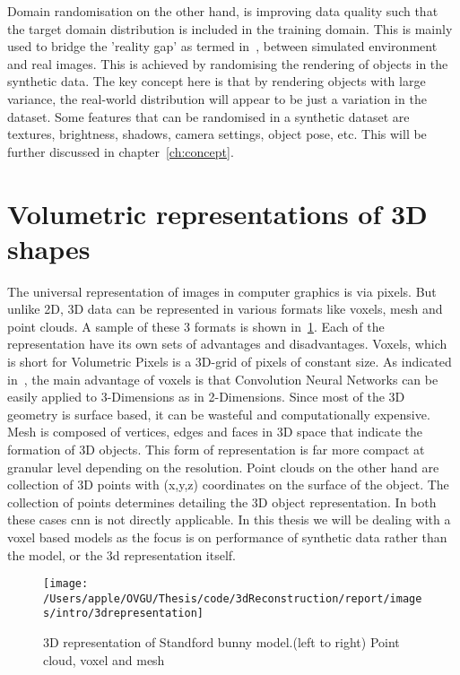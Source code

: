 Domain randomisation on the other hand, is improving data quality such that the target domain distribution is included in the training domain.
This is mainly used to bridge the 'reality gap' as termed in~\cite{tobin2017domain}, between simulated environment and real images.
This is achieved by randomising the rendering of objects in the synthetic data.
The key concept here is that by rendering objects with large variance, the real-world distribution will appear to be just a variation in the dataset.
Some features that can be randomised in a synthetic dataset are textures, brightness, shadows, camera settings, object pose, etc.
This will be further discussed in chapter~\ref{ch:concept}.


\section{Volumetric representations of 3D shapes} \label{sec:Volumetric representation}
The universal representation of images in computer graphics is via pixels.
But unlike 2D, 3D data can be represented in various formats like voxels, mesh and point clouds.
A sample of these 3 formats is shown in~\ref{fig:3d representation}.
Each of the representation have its own sets of advantages and disadvantages.
Voxels, which is short for Volumetric Pixels is a 3D-grid of pixels of constant size.
As indicated in~\cite{li2016fpnn}, the main advantage of voxels is that Convolution Neural Networks can be easily applied to 3-Dimensions as in 2-Dimensions.
Since most of the 3D geometry is surface based, it can be wasteful and computationally expensive.
Mesh is composed of vertices, edges and faces in 3D space that indicate the formation of 3D objects.
This form of representation is far more compact at granular level depending on the resolution.
Point clouds on the other hand are collection of 3D points with (x,y,z) coordinates on the surface of the object.
The collection of points determines detailing the 3D object representation.
In both these cases \gls{cnn} is not directly applicable.
In this thesis we will be dealing with a voxel based models as the focus is on performance of synthetic data rather than the model, or the 3d representation itself.

\begin{figure}
    \centering
    \texttt{[image: /Users/apple/OVGU/Thesis/code/3dReconstruction/report/images/intro/3drepresentation]}
    \caption{3D representation of Standford bunny model.(left to right) Point cloud, voxel and mesh~\cite{Hoang2019ADL}
    \label{fig:3d representation}}
\end{figure}

